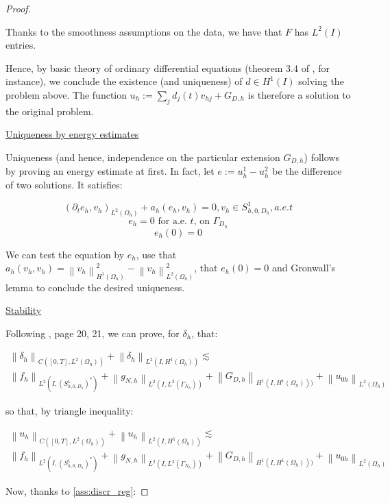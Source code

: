 \documentclass[english,a4paper,9pt,oneside]{scrbook}	%
\theoremstyle{break}
\newenvironment{mproof}[1][\proofname]{%
  \begin{proof}[#1]$ $\par\nobreak\ignorespaces
}{%
  \end{proof}
}
\renewcommand*{\proofname}{Proof}
\theoremstyle{remark}
\newcommand{\norm}[1]{\left\lVert#1\right\rVert}
\begin{document}
\begin{appendices}
\begin{mproof}
Thanks to the smoothness assumptions on the data, we have that $F$ has $L^2(I)$ entries.

Hence, by basic theory of ordinary differential equations (theorem 3.4 of \cite{odes}, for instance), we conclude the existence (and uniqueness) of $d \in H^1(I)$ solving the problem above. The function $u_h:=\sum_j d_j(t)v_{hj} + G_{D,h}$ is therefore a solution to the original problem. 

\underline{Uniqueness by energy estimates}

Uniqueness (and hence, independence on the particular extension $G_{D,h}$) follows by proving an energy estimate at first. In fact, let $e:=u_h^1-u_h^2$ be the difference of two solutions. It satisfies:

$$(\partial_t e_h, v_h)_{L^2(\Omega_h)} + a_h(e_h, v_h) = 0 , v_h \in S^1_{h,0,D_h}, a.e. t$$
$$e_h=0 \text{ for a.e. }t \text{,  on } \Gamma_{D_h}$$
$$e_h(0)=0$$

We can test the equation by $e_h$, use that $a_h(v_h,v_h) = \norm{v_h}_{H^1(\Omega_h)}^2-\norm{v_h}_{L^2(\Omega_h)}^2$, that $e_h(0)=0$ and Gronwall's lemma to conclude the desired uniqueness.

\underline{Stability}

Following \cite{gilardi}, page 20, 21, we can prove, for $\delta_h$, that:

\begin{align*}
	\norm{\delta_h}_{C([0,T],L^2(\Omega_h))} + \norm{\delta_h}_{L^2(I,H^1(\Omega_h))}\lesssim \\\norm{f_h}_{L^2(I,(S^1_{h,0,D_h})^*)} + \norm{g_{N,h}}_{L^2(I,L^2(\Gamma_{N_h}))} + \norm{G_{D,h}}_{H^1(I,H^1(\Omega_h)))} + \norm{u_{0h}}_{L^2(\Omega_h)}
\end{align*}

so that, by triangle inequality:

\begin{align*}
	\norm{u_h}_{C([0,T],L^2(\Omega_h))} + \norm{u_h}_{L^2(I,H^1(\Omega_h))}\lesssim \\\norm{f_h}_{L^2(I,(S^1_{h,0,D_h})^*)} + \norm{g_{N,h}}_{L^2(I,L^2(\Gamma_{N_h}))} + \norm{G_{D,h}}_{H^1(I,H^1(\Omega_h)))}+\norm{u_{0h}}_{L^2(\Omega_h)}
\end{align*}

Now, thanks to \cref{ass:discr_reg}:


\end{mproof}
\end{appendices}
\end{document}
